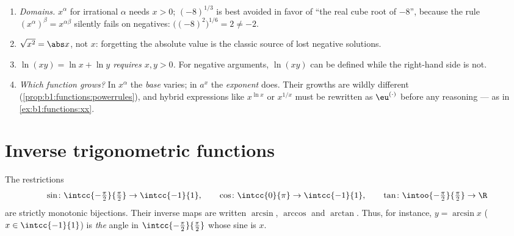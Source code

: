 \begin{remark}\label{rem:b1:functions:pitfalls}
\begin{enumerate}
  \item \emph{Domains.} $x^\alpha$ for irrational $\alpha$ needs
        $x > 0$; $(-8)^{1/3}$ is best avoided in favor of ``the
        real cube root of $-8$'', because the rule
        $(x^\alpha)^\beta = x^{\alpha\beta}$ silently fails on
        negatives: $\bigl((-8)^2\bigr)^{1/6} = 2 \neq -2$.
  \item \emph{$\sqrt{x^2} = \abs x$}, not $x$: forgetting the
        absolute value is the classic source of lost negative
        solutions.
  \item \emph{$\ln(xy) = \ln x + \ln y$ requires $x, y > 0$.} For
        negative arguments, $\ln(xy)$ can be defined while the
        right-hand side is not.
  \item \emph{Which function grows?} In $x^\alpha$ the
        \emph{base} varies; in $a^x$ the \emph{exponent} does.
        Their growths are wildly different
        (\cref{prop:b1:functions:powerrules}), and hybrid
        expressions like $x^{\ln x}$ or $x^{1/x}$ must be
        rewritten as $\eu^{(\cdot)}$ before any reasoning ---
        as in \cref{ex:b1:functions:xx}.
\end{enumerate}
\end{remark}

\section{Inverse trigonometric functions}

\begin{definition}[$\arcsin$, $\arccos$, $\arctan$]\label{def:b1:functions:arc}
The restrictions
\[
\sin \colon \intcc{-\tfrac\pi2}{\tfrac\pi2} \to \intcc{-1}{1},
\qquad
\cos \colon \intcc{0}{\pi} \to \intcc{-1}{1},
\qquad
\tan \colon \intoo{-\tfrac\pi2}{\tfrac\pi2} \to \R
\]
are strictly monotonic bijections. Their inverse maps are written
$\arcsin$, $\arccos$ and
$\arctan$. Thus, for instance, $y = \arcsin x$
($x \in \intcc{-1}{1}$) is \emph{the} angle in
$\intcc{-\frac\pi2}{\frac\pi2}$ whose sine is $x$.
\end{definition}

